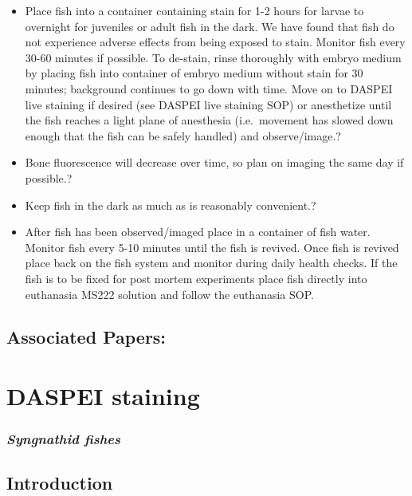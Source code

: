 \documentclass[
  letterpaper,
  DIV=11,
  numbers=noendperiod]{scrreprt}
\providecommand{\tightlist}{%
  \setlength{\itemsep}{0pt}\setlength{\parskip}{0pt}}\usepackage{longtable,booktabs,array}
\begin{document}
\begin{itemize}
\tightlist
\item
  Place fish into a container containing stain for 1-2 hours for larvae
  to overnight for juveniles or adult fish in the dark. We have found
  that fish do not experience adverse effects from being exposed to
  stain. Monitor fish every 30-60 minutes if possible. To de-stain,
  rinse thoroughly with embryo medium by placing fish into container of
  embryo medium without stain for 30 minutes; background continues to go
  down with time. Move on to DASPEI live staining if desired (see DASPEI
  live staining SOP) or anesthetize until the fish reaches a light plane
  of anesthesia (i.e.~movement has slowed down enough that the fish can
  be safely handled) and observe/image.?
\item
  Bone fluorescence will decrease over time, so plan on imaging the same
  day if possible.?
\item
  Keep fish in the dark as much as is reasonably convenient.?
\item
  After fish has been observed/imaged place in a container of fish
  water. Monitor fish every 5-10 minutes until the fish is revived. Once
  fish is revived place back on the fish system and monitor during daily
  health checks. If the fish is to be fixed for post mortem experiments
  place fish directly into euthanasia MS222 solution and follow the
  euthanasia SOP.
\end{itemize}

\hypertarget{associated-papers-24}{%
\section{Associated Papers:}\label{associated-papers-24}}

\hypertarget{sec-xxx-xxx}{%
\chapter{DASPEI staining}\label{sec-xxx-xxx}}

\hypertarget{syngnathid-fishes-2}{%
\subsection{\texorpdfstring{\emph{Syngnathid
fishes}}{Syngnathid fishes}}\label{syngnathid-fishes-2}}

\hypertarget{introduction-41}{%
\section{Introduction}\label{introduction-41}}
\end{document}
